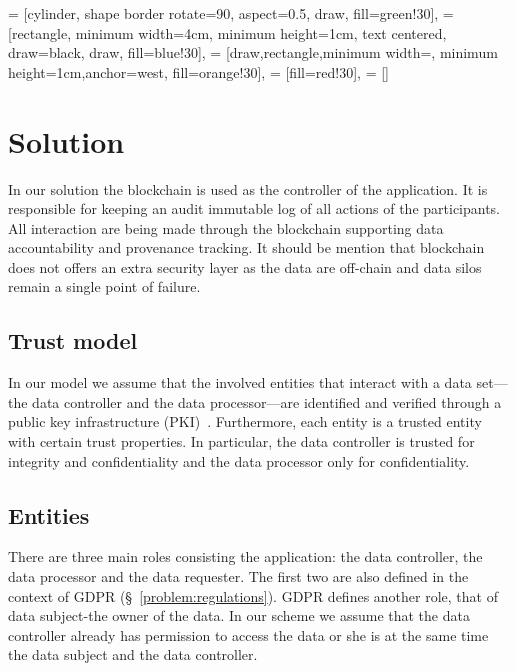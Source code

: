 
 = [cylinder, shape border rotate=90, aspect=0.5, draw, fill=green!30],
 = [rectangle, minimum width=4cm, minimum height=1cm, text centered, draw=black, draw, fill=blue!30],
 = [draw,rectangle,minimum width=\textwidth, minimum height=1cm,anchor=west, fill=orange!30],
 = [fill=red!30],
 = []

\chapter{Solution}
\label{solution}

In our solution the blockchain is used as the controller of the application. It is responsible for keeping an
audit immutable log of all actions of the participants. All interaction are being made
through the blockchain supporting data accountability and provenance tracking. It should be mention that blockchain does not offers an extra security layer as the data are off-chain and data silos remain a single point of failure.

\section{Trust model}
\label{solution:trust_model}

In our model we assume that the involved entities that interact with a data set---the data controller and the data processor---are identified and verified through a public key infrastructure (PKI)~\cite{adams_understanding_2003}. Furthermore, each entity is a trusted entity with certain trust properties. In particular, the data controller is trusted for integrity and confidentiality and the data processor only for confidentiality.

\section{Entities}
\label{solution:entities}

There are three main roles consisting the application: the data controller, the data processor
and the data requester. The first two are also defined in the context of GDPR (§~\ref{problem:regulations}).
GDPR defines another role, that of data subject-the owner of the data.
In our scheme we assume that the data controller already has permission to access the data or
she is at the same time the data subject and the data controller.

